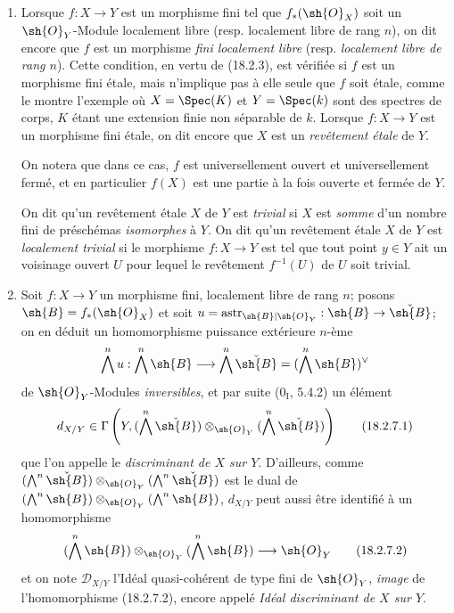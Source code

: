 \begin{remarks}[18.2.7]
\label{IV.18.2.7}
\begin{enumerate}
  \item[(i)] Lorsque $f:X\to Y$ est un morphisme fini tel que $f_*(\sh{O}_X)$ soit un $\sh{O}_Y$-Module localement libre (resp. localement libre de rang $n$), on dit encore que $f$ est un morphisme \emph{fini localement libre} (resp. \emph{localement libre de rang $n$}). Cette condition, en vertu de (18.2.3), est vérifiée si $f$ est un morphisme fini étale, mais n'implique pas à elle seule que $f$ soit étale, comme le montre l'exemple où $X=\Spec(K)$ et $Y=\Spec(k)$ sont des spectres de corps, $K$ étant une extension finie non séparable de $k$. Lorsque $f:X\to Y$ est un morphisme fini étale, on dit encore que $X$ est un \emph{revêtement étale} de $Y$.

On notera que dans ce cas, $f$ est universellement ouvert et universellement fermé, et en particulier $f(X)$ est une partie à la fois ouverte et fermée de $Y$.

On dit qu'un revêtement étale $X$ de $Y$ est \emph{trivial} si $X$ est \emph{somme} d'un nombre fini de préschémas \emph{isomorphes} à $Y$. On dit qu'un revêtement étale $X$ de $Y$ est \emph{localement trivial} si le morphisme $f:X\to Y$ est tel que tout point $y\in Y$ ait un voisinage ouvert $U$ pour lequel le revêtement $f^{-1}(U)$ de $U$ soit trivial.

  \item[(ii)] Soit $f:X\to Y$ un morphisme fini, localement libre de rang $n$; posons $\sh{B}=f_*(\sh{O}_X)$ et soit $u=\operatorname{astr}_{\sh{B}|\sh{O}_Y}:\sh{B}\to\check{\sh{B}}$; on en déduit un homomorphisme puissance extérieure $n$-ème
\[
  \bigwedge^n u:\bigwedge^n\sh{B}\longrightarrow\bigwedge^n\check{\sh{B}}=(\bigwedge^n\sh{B})^\vee
\]
de $\sh{O}_Y$-Modules \emph{inversibles}, et par suite ($0_{\mathrm I}$, 5.4.2) un élément
\begin{equation}
  d_{X/Y}\in\Gamma\left(Y,(\bigwedge^n\check{\sh{B}})\otimes_{\sh{O}_Y}(\bigwedge^n\check{\sh{B}})\right)
  \tag{18.2.7.1}\label{IV.18.2.7.1}
\end{equation}
que l'on appelle le \emph{discriminant de $X$ sur $Y$}. D'ailleurs, comme $(\bigwedge^n\check{\sh{B}})\otimes_{\sh{O}_Y}(\bigwedge^n\check{\sh{B}})$ est le dual de $(\bigwedge^n\sh{B})\otimes_{\sh{O}_Y}(\bigwedge^n\sh{B})$, $d_{X/Y}$ peut aussi être identifié à un homomorphisme
\begin{equation}
  (\bigwedge^n\sh{B})\otimes_{\sh{O}_Y}(\bigwedge^n\sh{B})\longrightarrow\sh{O}_Y
  \tag{18.2.7.2}\label{IV.18.2.7.2}
\end{equation}
et on note $\mathscr{D}_{X/Y}$ l'Idéal quasi-cohérent de type fini de $\sh{O}_Y$, \emph{image} de l'homomorphisme (18.2.7.2), encore appelé \emph{Idéal discriminant de $X$ sur $Y$}.
\end{enumerate}
\end{remarks}

